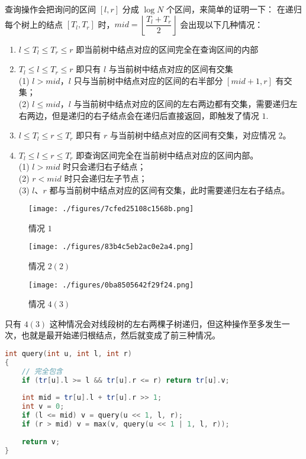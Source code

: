 查询操作会把询问的区间 $[l, r]$ 分成 $\log N$ 个区间，来简单的证明一下：
在递归每个树上的结点 $[T_l, T_r]$ 时，$mid = \left\lfloor\dfrac{T_l+T_r}{2}\right\rfloor$ 会出现以下几种情况：

\begin{enumerate}
\item $l \leq T_l \leq T_r \leq r$ 即当前树中结点对应的区间完全在查询区间的内部
\item $T_l \leq l \leq T_r \leq r$ 即只有 $l$ 与当前树中结点对应的区间有交集\\
      (1) $l > mid$，$l$ 只与当前树中结点对应的区间的右半部分 $[mid + 1, r]$ 有交集； \\
      (2) $l \leq mid$，$l$ 与当前树中结点对应的区间的左右两边都有交集，需要递归左右两边，但是递归的右子结点会在递归后直接返回，即触发了情况 $1$.\\
\item $l \leq T_l \leq r \leq T_r$ 即只有 $r$ 与当前树中结点对应的区间有交集，对应情况 $2$。
\item $T_l \leq l \leq r \leq T_r$ 即查询区间完全在当前树中结点对应的区间内部。\\
      (1) $l > mid$ 时只会递归右子结点； \\
      (2) $r < mid$ 时只会递归左子节点； \\
      (3) $l$、$r$ 都与当前树中结点对应的区间有交集，此时需要递归左右子结点。 \\

\end{enumerate}

\begin{figure}[ht]
\centering
\texttt{[image: ./figures/7cfed25108c1568b.png]}
\caption{情况 $1$} \label{fig_STree_6}
\end{figure}

\begin{figure}[ht]
\centering
\texttt{[image: ./figures/83b4c5eb2ac0e2a4.png]}
\caption{情况 $2(2)$} \label{fig_STree_7}
\end{figure}

\begin{figure}[ht]
\centering
\texttt{[image: ./figures/0ba8505642f29f24.png]}
\caption{情况 $4(3)$} \label{fig_STree_8}
\end{figure}

只有 $4(3)$ 这种情况会对线段树的左右两棵子树递归，但这种操作至多发生一次，也就是最开始递归根结点，然后就变成了前三种情况。

\begin{lstlisting}[language=cpp]
int query(int u, int l, int r)
{
    // 完全包含
    if (tr[u].l >= l && tr[u].r <= r) return tr[u].v;  
    
    int mid = tr[u].l + tr[u].r >> 1;
    int v = 0;
    if (l <= mid) v = query(u << 1, l, r);
    if (r > mid) v = max(v, query(u << 1 | 1, l, r));
    
    return v;
}
\end{lstlisting}

